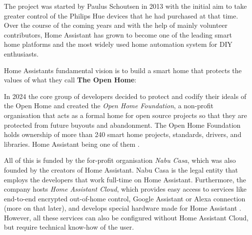 The project was started by Paulus Schoutsen in 2013 with the initial aim to take greater control of the Philips Hue devices that he had purchased at that time. Over the course of the coming years and with the help of mainly volunteer contributors, Home Assistant has grown to become one of the leading smart home platforms \cite{OpenHomeFoundation_About} and the most widely used home automation system for DIY enthusiasts.

Home Assistants fundamental vision is to build a smart home that protects the values of what they call \textbf{The Open Home}:


In 2024 the core group of developers decided to protect and codify their ideals of the Open Home and created the \textit{Open Home Foundation}, a non-profit organisation that acts as a formal home for open source projects so that they are protected from future buyouts and abandonment. The Open Home Foundation holds ownership of more than 240 smart home projects, standards, drivers, and libraries. Home Assistant being one of them \cite{OpenHomeFoundation_About}.

All of this is funded by the for-profit organisation \textit{Nabu Casa}, which was also founded by the creators of Home Assistant. Nabu Casa is the legal entity that employs the developers that work full-time on Home Assistant. Furthermore, the company hosts \textit{Home Assistant Cloud}, which provides easy access to services like end-to-end encrypted out-of-home control, Google Assistant or Alexa connection (more on that later), and develops special hardware made for Home Assistant \cite{NabuCasa_Startpage}. However, all these services can also be configured without Home Assistant Cloud, but require technical know-how of the user.

